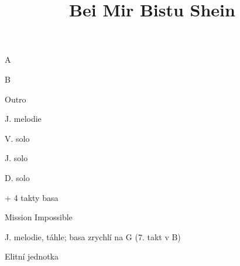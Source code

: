 \documentclass[timestamp]{jazzgrid}
\title{Bei Mir Bistu Shein}
\begin{document}
\maketitle

\begin{musicsection}{A}
\barline
	{}
	{\barfour{}{}{}{}{}}
	{}
	{\barfour{}{}{}{}{}}
\barline
	{}
	{\barfour{}{}{}{}{}}
	{}
	{}
	{}
	{}
\end{musicsection}

\begin{musicsection}{B}
\barline
	{}
	{\barfour{}{}{}{}{}}
	{}
	{\barfour{}{}{}{}{}}
\barline
	{}
	{}
	{}
	{}
\end{musicsection}

\begin{musicsection}{Outro}
	{}
	{}
\end{musicsection}

\footnotesize
\begin{description}[noitemsep,align=right,labelwidth=\widthof{\bfseries{AABA}}]
	\item [AABA] J. melodie
	\item [AABA] V. solo
	\item [AABA] J. solo
	\item [AABA] D. solo
	\item [    ] + 4 takty basa
	\item [AA\phantom{BA}] Mission Impossible
	\item [\phantom{AA}BA] J. melodie, táhle; basa zrychlí na G (7. takt v B)
	\item [    ] Elitní jednotka
\end{description}
\end{document}
